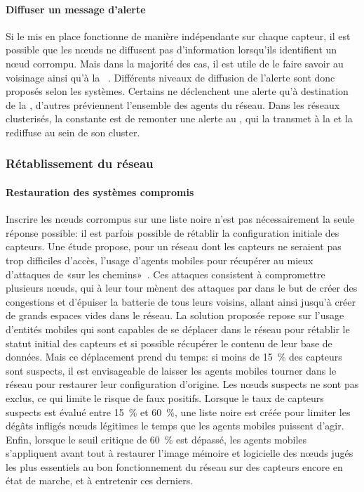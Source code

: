         \paragraph{Diffuser un message d'alerte}
Si le \ids mis en place fonctionne de manière indépendante sur chaque capteur, il est possible que les nœuds ne diffusent pas d'information lorsqu'ils identifient un nœud corrompu.
Mais dans la majorité des cas, il est utile de le faire savoir au voisinage ainsi qu'à la \sdb~\cite{BMS13}.
Différents niveaux de diffusion de l'alerte sont donc proposés selon les systèmes.
Certains ne déclenchent une alerte qu'à destination de la \sdb, d'autres préviennent l'ensemble des agents du réseau.
Dans les réseaux clusterisés, la constante est de remonter une alerte au \ch, qui la transmet à la \sdb et la rediffuse au sein de son cluster.

    \subsubsection{Rétablissement du réseau}
        \paragraph{Restauration des systèmes compromis}
Inscrire les nœuds corrompus sur une liste noire n'est pas nécessairement la seule réponse possible: il est parfois possible de rétablir la configuration initiale des capteurs.
Une étude propose, pour un réseau dont les capteurs ne seraient pas trop difficiles d'accès, l'usage d'agents mobiles pour récupérer au mieux d'attaques de \dds «sur les chemins»~\cite{LB09}.
Ces attaques consistent à compromettre plusieurs nœuds, qui à leur tour mènent des attaques par \deluge dans le but de créer des congestions et d'épuiser la batterie de tous leurs voisins, allant ainsi jusqu'à créer de grands espaces vides dans le réseau.
La solution proposée repose sur l'usage d'entités mobiles qui sont capables de se déplacer dans le réseau pour rétablir le statut initial des capteurs et si possible récupérer le contenu de leur base de données.
Mais ce déplacement prend du temps: si moins de 15~\% des capteurs sont suspects, il est envisageable de laisser les agents mobiles tourner dans le réseau pour restaurer leur configuration d'origine.
Les nœuds suspects ne sont pas exclus, ce qui limite le risque de faux positifs.
Lorsque le taux de capteurs suspects est évalué entre 15~\% et 60~\%, une liste noire est créée pour limiter les dégâts infligés nœuds légitimes le temps que les agents mobiles puissent d'agir.
Enfin, lorsque le seuil critique de 60~\% est dépassé, les agents mobiles s'appliquent avant tout à restaurer l'image mémoire et logicielle des nœuds jugés les plus essentiels au bon fonctionnement du réseau sur des capteurs encore en état de marche, et à entretenir ces derniers.

